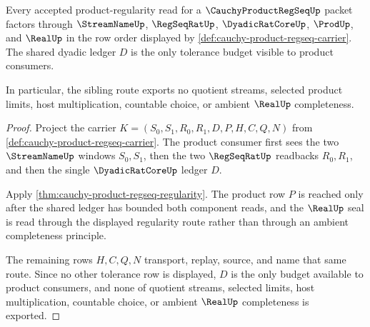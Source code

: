 \begin{theorem}
\label{thm:cauchy-product-regseq-sibling-route}
Every accepted product-regularity read for a $\CauchyProductRegSeqUp$ packet factors through $\StreamNameUp$, $\RegSeqRatUp$, $\DyadicRatCoreUp$, $\ProdUp$, and $\RealUp$ in the row order displayed by \autoref{def:cauchy-product-regseq-carrier}. The shared dyadic ledger $D$ is the only tolerance budget visible to product consumers.

In particular, the sibling route exports no quotient streams, selected product limits, host multiplication, countable choice, or ambient $\RealUp$ completeness.
\end{theorem}
\begin{proof}
Project the carrier $K=(S_0,S_1,R_0,R_1,D,P,H,C,Q,N)$ from \autoref{def:cauchy-product-regseq-carrier}. The product consumer first sees the two $\StreamNameUp$ windows $S_0,S_1$, then the two $\RegSeqRatUp$ readbacks $R_0,R_1$, and then the single $\DyadicRatCoreUp$ ledger $D$.

Apply \autoref{thm:cauchy-product-regseq-regularity}. The product row $P$ is reached only after the shared ledger has bounded both component reads, and the $\RealUp$ seal is read through the displayed regularity route rather than through an ambient completeness principle.

The remaining rows $H,C,Q,N$ transport, replay, source, and name that same route. Since no other tolerance row is displayed, $D$ is the only budget available to product consumers, and none of quotient streams, selected limits, host multiplication, countable choice, or ambient $\RealUp$ completeness is exported.
\end{proof}

